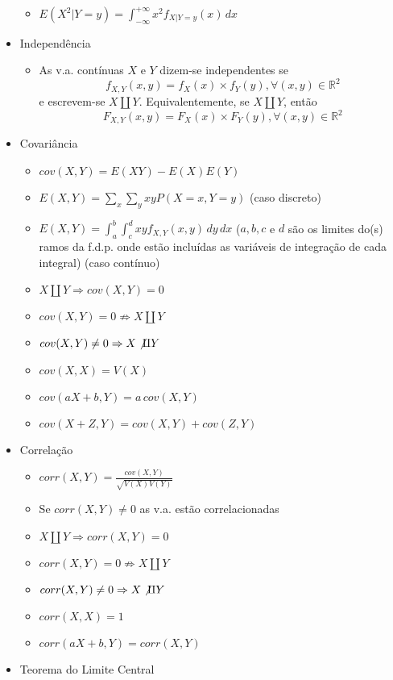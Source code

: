 \documentclass[a4paper]{report}
\begin{document}
\begin{itemize}
\begin{itemize}
				\item $E(X^2|Y=y)=\int_{-\infty}^{+\infty}x^2f_{X|Y=y}(x)\,dx$
			\end{itemize}
			\item Independência
			\begin{itemize}
				\item As v.a. contínuas $X$ e $Y$ dizem-se independentes se $$f_{X,Y}(x,y)=f_X(x)\times f_Y(y),\forall(x,y)\in\mathbb R^2$$ e escrevem-se $X\amalg Y$. Equivalentemente, se $X\amalg Y$, então $$F_{X,Y}(x,y)=F_X(x)\times F_Y(y),\forall(x,y)\in\mathbb R^2$$
			\end{itemize}
			\item Covariância
			\begin{itemize}
				\item $cov(X,Y)=E(XY)-E(X)E(Y)$
				\item $E(X,Y)=\sum_x\sum_yxyP(X=x,Y=y)$ (caso discreto)
				\item $E(X,Y)=\int_a^b\int_c^dxyf_{X,Y}(x,y)\,dy\,dx$ ($a, b, c$ e $d$ são os limites do(s) ramos da f.d.p. onde estão incluídas as variáveis de integração de cada integral) (caso contínuo)
				\item $X\amalg Y\Rightarrow cov(X,Y)=0$
				\item $cov(X,Y)=0\not\Rightarrow X\amalg Y$
				\item $cov(X,Y)\neq 0\Rightarrow X\not\amalg Y$
				\item $cov(X,X)=V(X)$
				\item $cov(aX+b,Y)=a\,cov(X,Y)$
				\item $cov(X+Z,Y)=cov(X,Y)+cov(Z,Y)$
			\end{itemize}
			\item Correlação
			\begin{itemize}
				\item $corr(X,Y)=\frac{cov(X,Y)}{\sqrt{V(X)V(Y)}}$
				\item Se $corr(X,Y)\neq 0$ as v.a. estão correlacionadas
				\item $X\amalg Y\Rightarrow corr(X,Y)=0$
				\item $corr(X,Y)=0\not\Rightarrow X\amalg Y$
				\item $corr(X,Y)\neq 0\Rightarrow X\not\amalg Y$
				\item $corr(X,X)=1$
				\item $corr(aX+b,Y)=corr(X,Y)$
			\end{itemize}
			\item Teorema do Limite Central
				\begin{itemize}

\end{itemize}
\end{itemize}
\end{document}
